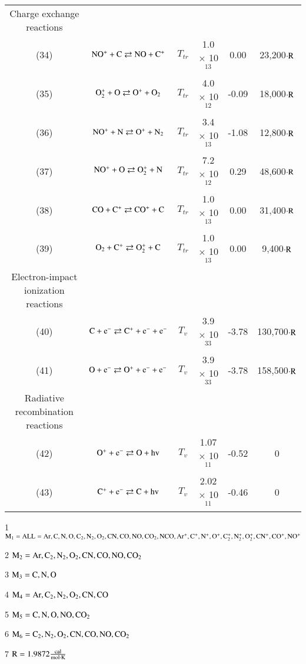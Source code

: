 \documentclass{warpdoc}
\begin{document}
\begin{table}[!h]
\begin{center}
\begin{threeparttable}
\begin{tabular}{cccccc}
Charge exchange reactions \\

(34) & $\rm NO^+ + C \rightleftarrows NO + C^+ $ & $T_{tr}$ & 1.0 $\times$ 10$^{13}$  & 0.00 & 23,200$\cdot \rm R$ \\
(35) & $\rm O^+_2 + O \rightleftarrows O^+ + O_2 $ & $T_{tr}$ & 4.0 $\times$ 10$^{12}$  & -0.09 & 18,000$\cdot \rm R$ \\
(36) & $\rm NO^+ + N \rightleftarrows O^+ + N_2 $ & $T_{tr}$ & 3.4 $\times$ 10$^{13}$  & -1.08 & 12,800$\cdot \rm R$ \\
(37) & $\rm NO^+ + O \rightleftarrows O^+_2 + N $ & $T_{tr}$ & 7.2 $\times$ 10$^{12}$  & 0.29 & 48,600$\cdot \rm R$ \\
(38) & $\rm CO + C^+ \rightleftarrows CO^+ + C $ & $T_{tr}$ & 1.0 $\times$ 10$^{13}$  & 0.00 & 31,400$\cdot \rm R$ \\
(39) & $\rm O_2 + C^+ \rightleftarrows O^+_2+ C $ & $T_{tr}$ & 1.0 $\times$ 10$^{13}$  & 0.00 & 9,400$\cdot \rm R$ \\

Electron-impact ionization reactions \\

(40) & $\rm C + e^- \rightleftarrows C^+ + e^- + e^- $ & $T_v$ & 3.9 $\times$ 10$^{33}$  & -3.78 & 130,700$\cdot \rm R$ \\
(41) & $\rm O + e^- \rightleftarrows O^+ + e^- + e^- $ & $T_v$ & 3.9 $\times$ 10$^{33}$  & -3.78 & 158,500$\cdot \rm R$ \\

Radiative recombination reactions \\

(42) & $\rm O^+ + e^- \rightleftarrows O + hv $ & $T_v$ & 1.07 $\times$ 10$^{11}$  & -0.52 & 0 \\
(43) & $\rm C^+ + e^- \rightleftarrows C + hv $ & $T_v$ & 2.02 $\times$ 10$^{11}$  & -0.46 & 0 \\


\bottomrule
\end{tabular}
\label{tab:park}
\begin{tablenotes}
\item[{1}] $\rm M_1 = ALL = Ar, C, N, O, C_2, N_2, O_2, CN, CO, NO, CO_2, NCO, Ar^+, C^+, N^+, O^+, C^+_2, N^+_2, O^+_2, CN^+, CO^+, NO^+$
\item[{2}] $\rm M_2 = Ar, C_2, N_2, O_2, CN, CO, NO, CO_2$
\item[{3}] $\rm M_3 = C, N, O$
\item[{4}] $\rm M_4 = Ar, C_2, N_2, O_2, CN, CO$
\item[{5}] $\rm M_5 = C, N, O, NO, CO_2$
\item[{6}] $\rm M_6 = C_2, N_2, O_2, CN, CO, NO, CO_2$
\item[{7}] $\rm R = 1.9872 \frac{\rm cal}{\rm mol \cdot K}$

\end{tablenotes}
\end{threeparttable}
\end{center}
\end{table} 
%



\end{document}
